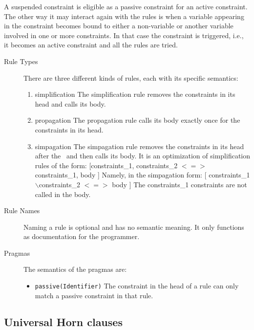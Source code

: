 \documentclass[thesis-solanki.tex]{subfiles}
\begin{document}
A suspended constraint is eligible as a passive constraint for an active constraint.
The other way it may interact again with the rules is when a variable appearing in the constraint becomes bound to
either a non-variable or another variable involved in one or more constraints.
In that case the constraint is triggered, i.e.,
it becomes an active constraint and all the rules are tried.
\begin{description}

\item [Rule Types]
  There are three different kinds of rules, each with its specific semantics:
\begin{enumerate}

\item simplification
The simplification rule removes the constraints in its head and calls its body.

\item propagation
The propagation rule calls its body exactly once for the constraints in its head.

\item simpagation
The simpagation rule removes the constraints in its head after the \ and then calls its body. It is an optimization of simplification rules 
of the form: [constraints\_1, constraints\_2 $<=>$ constraints\_1, body ] Namely, in the simpagation form: [ constraints\_1 
$\backslash$constraints\_2 $<=>$ body ] The constraints\_1 constraints are not called in the body.

\end{enumerate}


\item [Rule Names] Naming a rule is optional and has no semantic meaning. It only functions as documentation for the programmer.

\item [Pragmas] The semantics of the pragmas are:

  \begin{itemize}
  \item \Verb!passive(Identifier)!
    The constraint in the head of a rule 
    can only match a passive constraint in that rule.  
  \end{itemize}
\end{description}

\subsection{Universal Horn clauses}
\end{document}
